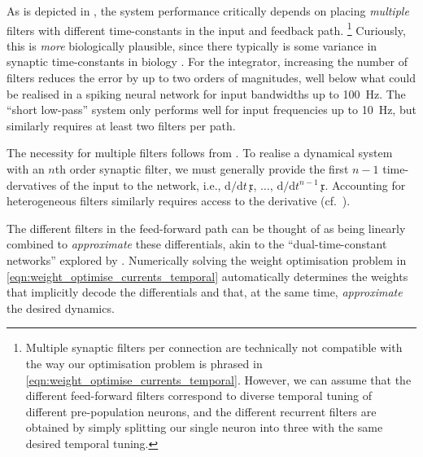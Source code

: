 As is depicted in , the system performance critically depends on placing \emph{multiple} filters with different time-constants in the input and feedback path.%
\footnote{Multiple synaptic filters per connection are technically not compatible with the way our optimisation problem is phrased in \cref{eqn:weight_optimise_currents_temporal}.
However, we can assume that the different feed-forward filters correspond to diverse temporal tuning of different pre-population neurons, and the different recurrent filters are obtained by simply splitting our single neuron into three with the same desired temporal tuning.}
Curiously, this is \emph{more} biologically plausible, since there typically is some variance in synaptic time-constants in biology \citep{jones2014neurotransmitter}.
For the integrator, increasing the number of filters reduces the error by up to two orders of magnitudes, well below what could be realised in a spiking neural network for input bandwidths up to \SI{100}{\hertz}.
The \enquote{short low-pass} system only performs well for input frequencies up to \SI{10}{\hertz}, but similarly requires at least two filters per path.

The necessity for multiple filters follows from \citet[Section~4.4, p.~591]{voelker2018improving}.
To realise a dynamical system with an $n$th order synaptic filter, we must generally provide the first $n - 1$ time-dervatives of the input to the network, i.e., $\mathrm{d} / \mathrm{d} t \, \mathfrak{x}$, $\ldots$, $\mathrm{d} / \mathrm{d} t^{n - 1} \, \mathfrak{x}$.
Accounting for heterogeneous filters similarly requires access to the derivative (cf.~).

The different filters in the feed-forward path can be thought of as being linearly combined to \emph{approximate} these differentials, akin to the \enquote{dual-time-constant networks} explored by \citet{tripp2010population}.
Numerically solving the weight optimisation problem in \cref{eqn:weight_optimise_currents_temporal} automatically determines the weights that implicitly decode the differentials and that, at the same time, \emph{approximate} the desired dynamics.

